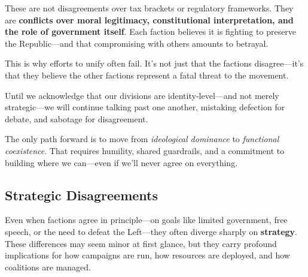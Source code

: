 These are not disagreements over tax brackets or regulatory frameworks. They are \textbf{conflicts over moral legitimacy, constitutional interpretation, and the role of government itself}. Each faction believes it is fighting to preserve the Republic—and that compromising with others amounts to betrayal.

This is why efforts to unify often fail. It’s not just that the factions disagree—it’s that they believe the other factions represent a fatal threat to the movement.

Until we acknowledge that our divisions are identity-level—and not merely strategic—we will continue talking past one another, mistaking defection for debate, and sabotage for disagreement.

The only path forward is to move from \textit{ideological dominance} to \textit{functional coexistence}. That requires humility, shared guardrails, and a commitment to building where we can—even if we’ll never agree on everything.


\subsection{Strategic Disagreements}

Even when factions agree in principle—on goals like limited government, free speech, or the need to defeat the Left—they often diverge sharply on \textbf{strategy}. These differences may seem minor at first glance, but they carry profound implications for how campaigns are run, how resources are deployed, and how coalitions are managed.

